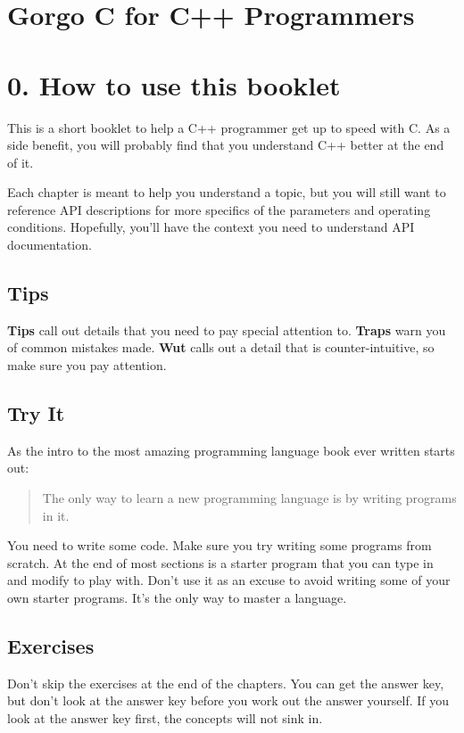 \documentclass[
]{article}
\subtitle{April 03, 2026}
\author{}
\date{}
\begin{document}
\hypertarget{c-for-c-programmers}{%
\section{Gorgo C for C++ Programmers}\label{c-for-c-programmers}}

\newpage

\hypertarget{how-to-use-this-booklet}{%
\section{0. How to use this booklet}\label{how-to-use-this-booklet}}

This is a short booklet to help a C++ programmer get up to speed with C.
As a side benefit, you will probably find that you understand C++ better
at the end of it.

Each chapter is meant to help you understand a topic, but you will still
want to reference API descriptions for more specifics of the parameters
and operating conditions. Hopefully, you'll have the context you need to
understand API documentation.

\hypertarget{tips}{%
\subsection{Tips}\label{tips}}

\textbf{Tips} call out details that you need to pay special attention
to. \textbf{Traps} warn you of common mistakes made. \textbf{Wut} calls
out a detail that is counter-intuitive, so make sure you pay attention.

\hypertarget{try-it}{%
\subsection{Try It}\label{try-it}}

As the intro to the most amazing programming language book ever written
starts out:

\begin{quote}
The only way to learn a new programming language is by writing programs
in it.
\end{quote}

You need to write some code. Make sure you try writing some programs
from scratch. At the end of most sections is a starter program that you
can type in and modify to play with. Don't use it as an excuse to avoid
writing some of your own starter programs. It's the only way to master a
language.

\hypertarget{exercises}{%
\subsection{Exercises}\label{exercises}}

Don't skip the exercises at the end of the chapters. You can get the
answer key, but don't look at the answer key before you work out the
answer yourself. If you look at the answer key first, the concepts will
not sink in.
\end{document}
